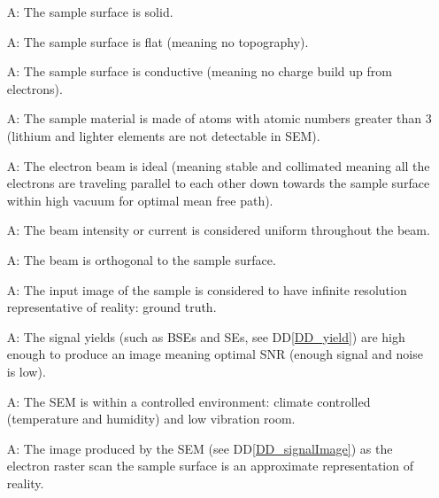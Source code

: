 \documentclass[12pt]{article}
\newcommand{\ddref}[1]{DD\ref{#1}}
\newcounter{assumpnum} %
\begin{document}
\begin{itemize}

\item[A\refstepcounter{assumpnum}\theassumpnum \label{A_sampleSolid}:] The sample 
surface is solid.

\item[A\refstepcounter{assumpnum}\theassumpnum \label{A_sampleTopo}:] The sample 
surface is flat (meaning no topography).

\item[A\refstepcounter{assumpnum}\theassumpnum \label{A_sampleConductive}:] The sample 
surface is conductive (meaning no charge build up from electrons).

\item[A\refstepcounter{assumpnum}\theassumpnum \label{A_sampleZ}:] The sample 
material is made of atoms with atomic numbers greater than 3 (lithium and lighter elements are not detectable in SEM).

\item[A\refstepcounter{assumpnum}\theassumpnum \label{A_beam}:] The electron 
beam is ideal (meaning stable and collimated meaning all the electrons are 
traveling parallel to each other down towards the sample surface within high 
vacuum for optimal mean free path).

\item[A\refstepcounter{assumpnum}\theassumpnum \label{A_beam1}:] The beam 
intensity or current is considered uniform throughout the beam.

\item[A\refstepcounter{assumpnum}\theassumpnum \label{A_beam2}:] The beam is orthogonal to the sample surface.

\item[A\refstepcounter{assumpnum}\theassumpnum \label{A_inputImage}:] The input 
image of the sample is considered to have infinite resolution representative of reality: ground truth.

\item[A\refstepcounter{assumpnum}\theassumpnum \label{A_yield}:] The signal yields (such as BSEs and SEs, see \ddref{DD_yield})
are high enough to produce an image meaning optimal SNR (enough signal and noise is low).

\item[A\refstepcounter{assumpnum}\theassumpnum \label{A_environment}:] The SEM 
is within a controlled environment: climate controlled (temperature and 
humidity) and low vibration room.

\item[A\refstepcounter{assumpnum}\theassumpnum \label{A_reality}:] The image 
produced by the SEM (see \ddref{DD_signalImage}) as the electron raster scan the sample surface is an 
approximate representation of reality.

\end{itemize}
\end{document}
